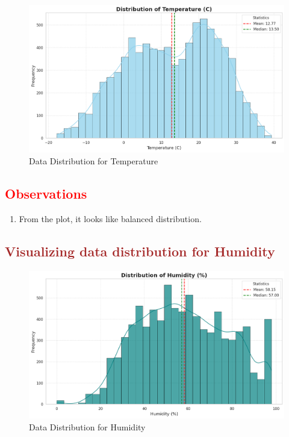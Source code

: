 \documentclass[12pt, letterpaper]{article}
\begin{document}
\begin{figure}[h]
  \centering
  \includegraphics[width=1\textwidth]{temperature1.png}
  \caption{Data Distribution for Temperature}
\end{figure}

\subsection*{\textcolor{red}{Observations}}
\begin{enumerate}
  \item From the plot, it looks like balanced distribution.
\end{enumerate}

\newpage

\subsection*{\textcolor{brown}{Visualizing data distribution for Humidity}}

\begin{figure}[h]
  \centering
  \includegraphics[width=1\textwidth]{humanity1.png}
  \caption{Data Distribution for Humidity}
\end{figure}
\end{document}
